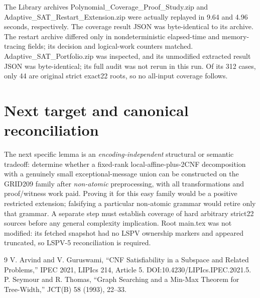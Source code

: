 \documentclass[11pt]{article}
\begin{document}
The Library archives Polynomial\_Coverage\_Proof\_Study.zip and Adaptive\_SAT\_Restart\_Extension.zip were actually replayed in 9.64 and 4.96 seconds, respectively. The coverage result JSON was byte-identical to its archive. The restart archive differed only in nondeterministic elapsed-time and memory-tracing fields; its decision and logical-work counters matched. Adaptive\_SAT\_Portfolio.zip was inspected, and its unmodified extracted result JSON was byte-identical; its full audit was not rerun in this run. Of its 312 cases, only 44 are original strict exact22 roots, so no all-input coverage follows.

\section{Next target and canonical reconciliation}
The next specific lemma is an \emph{encoding-independent} structural or semantic tradeoff: determine whether a fixed-rank local-affine-plus-2CNF decomposition with a genuinely small exceptional-message union can be constructed on the GRID209 family after \emph{non-atomic} preprocessing, with all transformations and proof/witness work paid. Proving it for this easy family would be a positive restricted extension; falsifying a particular non-atomic grammar would retire only that grammar. A separate step must establish coverage of hard arbitrary strict22 sources before any general complexity implication. Root main.tex was not modified: its fetched snapshot had no LSPV ownership markers and appeared truncated, so LSPV-5 reconciliation is required.

\begin{thebibliography}{9}
 V. Arvind and V. Guruswami, ``CNF Satisfiability in a Subspace and Related Problems,'' IPEC 2021, LIPIcs 214, Article 5. DOI:10.4230/LIPIcs.IPEC.2021.5.
 P. Seymour and R. Thomas, ``Graph Searching and a Min-Max Theorem for Tree-Width,'' JCT(B) 58 (1993), 22--33.
\end{thebibliography}
\end{document}
